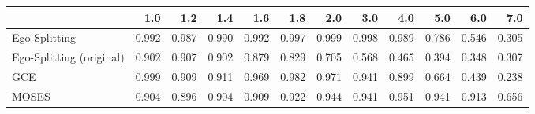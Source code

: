 \begin{tabular}{lrrrrrrrrrrr}
\toprule
{} &   1.0 &   1.2 &   1.4 &   1.6 &   1.8 &   2.0 &   3.0 &   4.0 &   5.0 &   6.0 &   7.0 \\
\midrule
Ego-Splitting            & 0.992 & 0.987 & 0.990 & 0.992 & 0.997 & 0.999 & 0.998 & 0.989 & 0.786 & 0.546 & 0.305 \\
Ego-Splitting (original) & 0.902 & 0.907 & 0.902 & 0.879 & 0.829 & 0.705 & 0.568 & 0.465 & 0.394 & 0.348 & 0.307 \\
GCE                      & 0.999 & 0.909 & 0.911 & 0.969 & 0.982 & 0.971 & 0.941 & 0.899 & 0.664 & 0.439 & 0.238 \\
MOSES                    & 0.904 & 0.896 & 0.904 & 0.909 & 0.922 & 0.944 & 0.941 & 0.951 & 0.941 & 0.913 & 0.656 \\
\bottomrule
\end{tabular}
